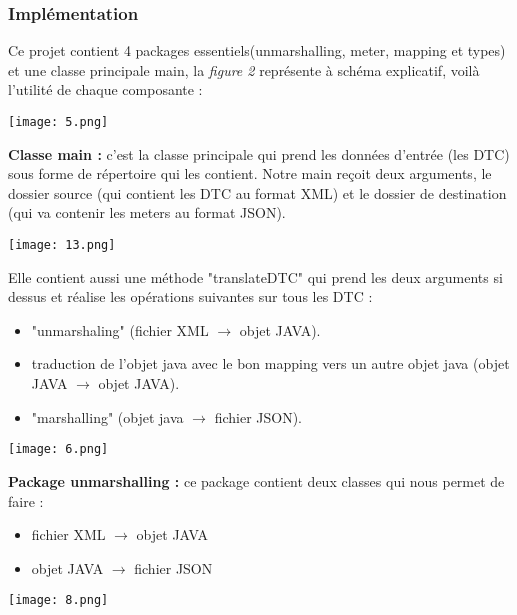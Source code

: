 \subsubsection{Implémentation}
Ce projet contient 4 packages essentiels(unmarshalling, meter, mapping et types) et une classe principale main, la \emph{figure 2} représente à schéma explicatif, voilà l'utilité de chaque composante : 
\begin{center}
	\texttt{[image: 5.png]}
\end{center}
\textbf{Classe main :} c'est la classe principale qui prend les données d'entrée (les DTC) sous forme de répertoire qui les contient. 
Notre main reçoit deux arguments, le dossier source (qui contient les DTC au format XML) et le dossier de destination (qui va contenir les meters au format JSON).\\
\begin{center}
	\texttt{[image: 13.png]}
\end{center}
Elle contient aussi une méthode "translateDTC" qui prend les deux arguments si dessus et réalise les opérations suivantes sur tous les DTC :
\begin{itemize}
	\item "unmarshaling" (fichier XML $\to$ objet JAVA).
	\item traduction de l'objet java avec le bon mapping vers un autre objet java (objet JAVA $\to$ objet JAVA).
	\item "marshalling" (objet java $\to$ fichier JSON).	
\end{itemize}
\begin{center}
	\texttt{[image: 6.png]}
\end{center}
\textbf{Package unmarshalling :} ce package contient deux classes qui nous permet de faire :
\begin{itemize}
	\item fichier XML $\to$ objet JAVA
	\item objet JAVA $\to$ fichier JSON
\end{itemize}
\begin{center}
	\texttt{[image: 8.png]}
\end{center}
